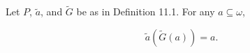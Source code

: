 Let $P$, $\tilde{a}$, and $\tilde{G}$ be as in Definition 11.1. For any $a \subseteq \omega$,

$$\tilde{a}(\tilde{G}(a)) = a.$$
